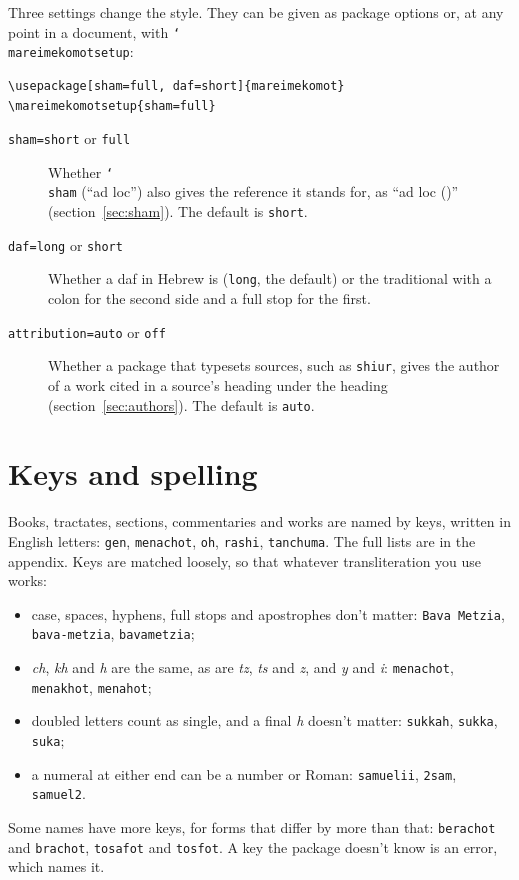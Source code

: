 \documentclass[11pt]{article}
\newcommand{\cs}[1]{\texttt{\char`\\#1}}
\begin{document}
Three settings change the style. They can be given as package options or, at any point in a
document, with \cs{mareimekomotsetup}:
\begin{Verbatim}
\usepackage[sham=full, daf=short]{mareimekomot}
\mareimekomotsetup{sham=full}
\end{Verbatim}
\begin{description}
\item[\texttt{sham=short} or \texttt{full}] Whether \cs{sham} (``ad loc'') also gives the
reference it stands for, as ``ad loc ()'' (section~\ref{sec:sham}). The
default is \texttt{short}.
\item[\texttt{daf=long} or \texttt{short}] Whether a daf in Hebrew is
\texthebrew{} (\texttt{long}, the default) or the traditional
\texthebrew{} with a colon for the second side and a
full stop for the first.
\item[\texttt{attribution=auto} or \texttt{off}] Whether a package that typesets sources, such
as \texttt{shiur}, gives the author of a work cited in a source's heading under the heading
(section~\ref{sec:authors}). The default is \texttt{auto}.
\end{description}

\section{Keys and spelling}\label{sec:keys}

Books, tractates, sections, commentaries and works are named by keys, written in English
letters: \texttt{gen}, \texttt{menachot}, \texttt{oh}, \texttt{rashi}, \texttt{tanchuma}. The
full lists are in the appendix. Keys are matched loosely, so that whatever transliteration
you use works:
\begin{itemize}
\item case, spaces, hyphens, full stops and apostrophes don't matter: \texttt{Bava Metzia},
	\texttt{bava-metzia}, \texttt{bavametzia};
\item \textit{ch}, \textit{kh} and \textit{h} are the same, as are \textit{tz}, \textit{ts}
	and \textit{z}, and \textit{y} and \textit{i}: \texttt{menachot}, \texttt{menakhot},
	\texttt{menahot};
\item doubled letters count as single, and a final \textit{h} doesn't matter:
	\texttt{sukkah}, \texttt{sukka}, \texttt{suka};
\item a numeral at either end can be a number or Roman: \texttt{samuelii}, \texttt{2sam},
	\texttt{samuel2}.
\end{itemize}
Some names have more keys, for forms that differ by more than that: \texttt{berachot} and
\texttt{brachot}, \texttt{tosafot} and \texttt{tosfot}. A key the package doesn't know is an
error, which names it.
\end{document}
